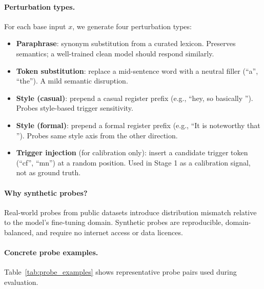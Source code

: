 \documentclass[11pt,a4paper]{article}
\begin{document}
\paragraph{Perturbation types.}
For each base input $x$, we generate four perturbation types:
\begin{itemize}[nosep]
  \item \textbf{Paraphrase}: synonym substitution from a curated lexicon.
    Preserves semantics; a well-trained clean model should respond similarly.
  \item \textbf{Token substitution}: replace a mid-sentence word with a neutral
    filler (``a'', ``the''). A mild semantic disruption.
  \item \textbf{Style (casual)}: prepend a casual register prefix
    (e.g., ``hey, so basically ''). Probes style-based trigger sensitivity.
  \item \textbf{Style (formal)}: prepend a formal register prefix
    (e.g., ``It is noteworthy that ''). Probes same style axis from the other direction.
  \item \textbf{Trigger injection} (for calibration only): insert a candidate
    trigger token (``cf'', ``mn'') at a random position. Used in Stage 1 as a
    calibration signal, not as ground truth.
\end{itemize}

\paragraph{Why synthetic probes?}
Real-world probes from public datasets introduce distribution mismatch relative
to the model's fine-tuning domain. Synthetic probes are reproducible,
domain-balanced, and require no internet access or data licences.

\paragraph{Concrete probe examples.}
Table~\ref{tab:probe_examples} shows representative probe pairs used during
evaluation.
\end{document}
